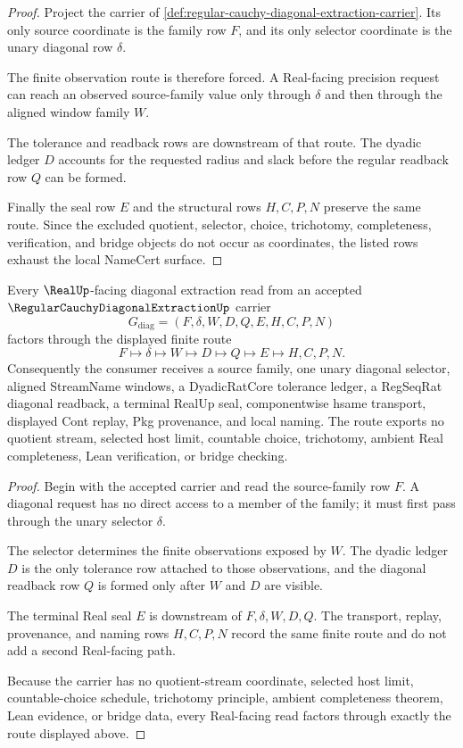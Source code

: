 \begin{proof}
Project the carrier of \autoref{def:regular-cauchy-diagonal-extraction-carrier}. Its only source coordinate is the family row $F$, and its only selector coordinate is the unary diagonal row $\delta$.

The finite observation route is therefore forced. A Real-facing precision request can reach an observed source-family value only through $\delta$ and then through the aligned window family $W$.

The tolerance and readback rows are downstream of that route. The dyadic ledger $D$ accounts for the requested radius and slack before the regular readback row $Q$ can be formed.

Finally the seal row $E$ and the structural rows $H,C,P,N$ preserve the same route. Since the excluded quotient, selector, choice, trichotomy, completeness, verification, and bridge objects do not occur as coordinates, the listed rows exhaust the local NameCert surface.
\end{proof}

\begin{theorem}
\label{thm:regular-cauchy-diagonal-extraction-real-seal-route}
Every $\RealUp$-facing diagonal extraction read from an accepted $\RegularCauchyDiagonalExtractionUp$ carrier
$$
G_{\mathrm{diag}}=(F,\delta,W,D,Q,E,H,C,P,N)
$$
factors through the displayed finite route
$$
F \longmapsto \delta \longmapsto W \longmapsto D \longmapsto Q \longmapsto E \longmapsto H,C,P,N .
$$
Consequently the consumer receives a source family, one unary diagonal selector, aligned StreamName windows, a DyadicRatCore tolerance ledger, a RegSeqRat diagonal readback, a terminal RealUp seal, componentwise hsame transport, displayed Cont replay, Pkg provenance, and local naming. The route exports no quotient stream, selected host limit, countable choice, trichotomy, ambient Real completeness, Lean verification, or bridge checking.
\end{theorem}
\begin{proof}
Begin with the accepted carrier and read the source-family row $F$. A diagonal request has no direct access to a member of the family; it must first pass through the unary selector $\delta$.

The selector determines the finite observations exposed by $W$. The dyadic ledger $D$ is the only tolerance row attached to those observations, and the diagonal readback row $Q$ is formed only after $W$ and $D$ are visible.

The terminal Real seal $E$ is downstream of $F,\delta,W,D,Q$. The transport, replay, provenance, and naming rows $H,C,P,N$ record the same finite route and do not add a second Real-facing path.

Because the carrier has no quotient-stream coordinate, selected host limit, countable-choice schedule, trichotomy principle, ambient completeness theorem, Lean evidence, or bridge data, every Real-facing read factors through exactly the route displayed above.
\end{proof}

